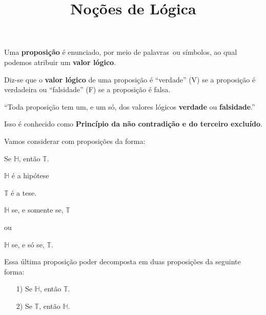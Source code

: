\documentclass{beamer}
\title{Noções de Lógica}
\author[\autor]{\autor}
\institute[\instituto]{\instituto}
\date{}
\begin{document}
    \begin{frame}
        \maketitle
    \end{frame}


    \begin{frame}
        \begin{definicao}
            Uma \textbf{proposição} é enunciado, \pause por meio de palavras\pause\ ou símbolos, \pause ao qual podemos atribuir um \textbf{valor lógico}.\pause
        \end{definicao}

        \begin{definicao}
            Diz-se que o \textbf{valor lógico} \pause de uma proposição é \pause ``verdade'' (V) \pause se a proposição é verdadeira \pause ou ``falsidade'' (F) \pause se a proposição é falsa.
        \end{definicao}
    \end{frame}

    \begin{frame}
        \begin{center}
            ``Toda proposição tem um, \pause e um só, \pause dos valores lógicos \textbf{verdade} ou \textbf{falsidade}.''\pause
        \end{center}
        Isso é conhecido como \pause \textbf{Princípio da não contradição \pause e do terceiro excluído}.\pause
    \end{frame}

    \begin{frame}
        Vamos considerar com proposições da forma:\pause

        \begin{center}
            Se $\mathbb{H}$, então $\mathbb{T}$.\pause
        \end{center}

        $\mathbb{H}$ é a hipótese\pause

        $\mathbb{T}$ é a tese.\pause

        \begin{center}
            $\mathbb{H}$ se, e somente se, $\mathbb{T}$\pause

            ou

            $\mathbb{H}$ se, e só se, $\mathbb{T}$.\pause
        \end{center}

        Essa última proposição poder decomposta em duas proposições da seguinte forma:\pause
        \begin{itemize}
            \item[1)] Se $\mathbb{H}$, \pause então $\mathbb{T}$.\pause
            \item[2)] Se $\mathbb{T}$, \pause então $\mathbb{H}$.
        \end{itemize}
    \end{frame}
\end{document}
